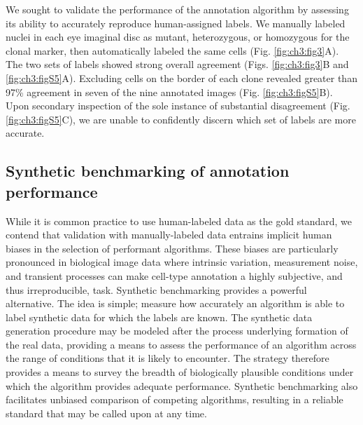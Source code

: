 We sought to validate the performance of the annotation algorithm by assessing its ability to accurately reproduce human-assigned labels. We manually labeled nuclei in each eye imaginal disc as mutant, heterozygous, or homozygous for the clonal marker, then automatically labeled the same cells (Fig. \ref{fig:ch3:fig3}A). The two sets of labels showed strong overall agreement (Figs. \ref{fig:ch3:fig3}B and \ref{fig:ch3:figS5}A). Excluding cells on the border of each clone revealed greater than 97\% agreement in seven of the nine annotated images (Fig. \ref{fig:ch3:figS5}B). Upon secondary inspection of the sole instance of substantial disagreement (Fig. \ref{fig:ch3:figS5}C), we are unable to confidently discern which set of labels are more accurate.

\subsection{Synthetic benchmarking of annotation performance}

While it is common practice to use human-labeled data as the gold standard, we contend that validation with manually-labeled data entrains implicit human biases in the selection of performant algorithms. These biases are particularly pronounced in biological image data where intrinsic variation, measurement noise, and transient processes can make cell-type annotation a highly subjective, and thus irreproducible, task. Synthetic benchmarking provides a powerful alternative. The idea is simple; measure how accurately an algorithm is able to label synthetic data for which the labels are known. The synthetic data generation procedure may be modeled after the process underlying formation of the real data, providing a means to assess the performance of an algorithm across the range of conditions that it is likely to encounter. The strategy therefore provides a means to survey the breadth of biologically plausible conditions under which the algorithm provides adequate performance. Synthetic benchmarking also facilitates unbiased comparison of competing algorithms, resulting in a reliable standard that may be called upon at any time.


